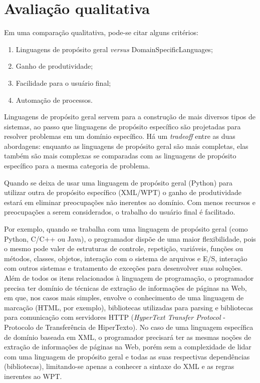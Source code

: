 \section{Avaliação qualitativa}

Em uma comparação qualitativa, pode-se citar alguns critérios:

\begin{enumerate}
	\item Linguagens de propósito geral \emph{versus} \glspl{DomainSpecificLanguage};
	\item Ganho de produtividade;
	\item Facilidade para o usuário final;
	\item Automação de processos.
\end{enumerate}

Linguagens de propósito geral servem para a construção de mais diversos tipos de sistemas, ao passo que linguagens de propósito específico são projetadas para resolver problemas em um domínio específico. Há um \emph{tradeoff} entre as duas abordagens: enquanto as linguagens de propósito geral são mais completas, elas também são mais complexas se comparadas com as linguagens de propósito específico para a mesma categoria de problema.

Quando se deixa de usar uma linguagem de propósito geral (Python) para utilizar outra de propósito específico (XML/WPT) o ganho de produtividade estará em eliminar preocupações não inerentes ao domínio. Com menos recursos e preocupações a serem considerados, o trabalho do usuário final é facilitado.

Por exemplo, quando se trabalha com uma linguagem de propósito geral (como Python, C/C++ ou Java), o programador dispõe de uma maior flexibilidade, pois o mesmo pode valer de estruturas de controle, repetição, variáveis, funções ou métodos, classes, objetos, interação com o sistema de arquivos e E/S, interação com outros sistemas e tratamento de exceções para desenvolver suas soluções. Além de todos os itens relacionados à linguagem de programação, o programador precisa ter domínio de técnicas de extração de informações de páginas na Web, em que, nos casos mais simples, envolve o conhecimento de uma linguagem de marcação (HTML, por exemplo), bibliotecas utilizadas para \gls{parsing} e bibliotecas para comunicação com servidores HTTP (\emph{HyperText Transfer Protocol} - Protocolo de Transferência de HiperTexto). No caso de uma linguagem específica de domínio baseada em XML, o programador precisará ter as mesmas noções de extração de informações de páginas na Web, porém sem a complexidade de lidar com uma linguagem de propósito geral e todas as suas respectivas dependências (bibliotecas), limitando-se apenas a conhecer a sintaxe do XML e as regras inerentes ao WPT.

